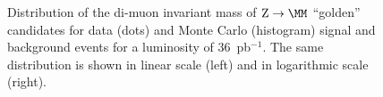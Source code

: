 \begin{figure}[hbtp]
\begin{minipage}{73mm}
\begin{center}
      \end{center}
    \end{minipage}
\caption{Distribution of the di-muon invariant mass of $\Zmm$ ``golden'' candidates for 
  data (dots) and Monte Carlo (histogram) signal and background events 
for  a luminosity of 36~pb$^{-1}$. The same distribution is shown in linear scale (left) and in 
logarithmic scale (right).}
\label{fig:zGolden36pb}
\end{figure} 
\begin{figure}[hbtp]
    \begin{minipage}{73mm}
      \begin{center}
      \end{center}
    \end{minipage}
    \begin{minipage}{73mm}
       \begin{center}

\end{center}
\end{minipage}
\end{figure}
